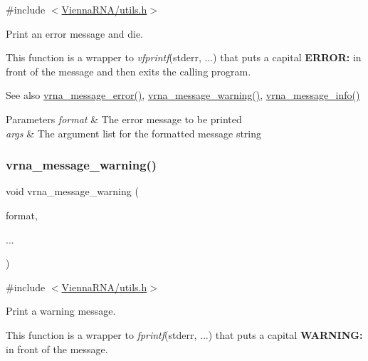 {\ttfamily \#include $<$\mbox{\hyperlink{utils_8h}{Vienna\+R\+N\+A/utils.\+h}}$>$}



Print an error message and die. 

This function is a wrapper to {\itshape vfprintf}(stderr, ...) that puts a capital {\bfseries E\+R\+R\+OR\+:} in front of the message and then exits the calling program.

\begin{DoxySeeAlso}{See also}
\mbox{\hyperlink{group__utils_ga36b35be01d7f36cf7f59c245eee628d1}{vrna\+\_\+message\+\_\+error()}}, \mbox{\hyperlink{group__utils_ga6e07ed24add60693ba886d54d0a46635}{vrna\+\_\+message\+\_\+warning()}}, \mbox{\hyperlink{group__utils_ga039bae6153a6415b054dbe6045f83d03}{vrna\+\_\+message\+\_\+info()}}
\end{DoxySeeAlso}

\begin{DoxyParams}{Parameters}
{\em format} & The error message to be printed \\
\hline
{\em args} & The argument list for the formatted message string \\
\hline
\end{DoxyParams}
\mbox{\label{group__utils_ga6e07ed24add60693ba886d54d0a46635}} 
\subsubsection{\texorpdfstring{vrna\+\_\+message\+\_\+warning()}{vrna\_message\_warning()}}
{\footnotesize\ttfamily void vrna\+\_\+message\+\_\+warning (\begin{DoxyParamCaption}\item[{const char $\ast$}]{format,  }\item[{}]{... }\end{DoxyParamCaption})}



{\ttfamily \#include $<$\mbox{\hyperlink{utils_8h}{Vienna\+R\+N\+A/utils.\+h}}$>$}



Print a warning message. 

This function is a wrapper to {\itshape fprintf}(stderr, ...) that puts a capital {\bfseries W\+A\+R\+N\+I\+NG\+:} in front of the message.


